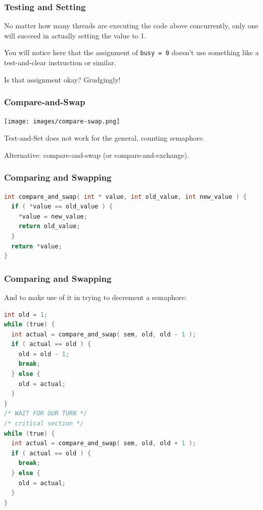 \begin{frame}
\frametitle{Testing and Setting}

No matter how many threads are executing the code above concurrently, only one will succeed in actually setting the value to 1.

You will notice here that the assignment of \texttt{busy = 0} doesn't use something like a test-and-clear instruction or similar.

Is that assignment okay? Grudgingly!

\end{frame}

\begin{frame}
\frametitle{Compare-and-Swap}

\begin{center}
	\texttt{[image: images/compare-swap.png]}
\end{center}

Test-and-Set does not work for the general, counting semaphore.

Alternative: \alert{compare-and-swap} (or compare-and-exchange).

\end{frame}

\begin{frame}[fragile]
\frametitle{Comparing and Swapping}

\begin{lstlisting}[language=C]
int compare_and_swap( int * value, int old_value, int new_value ) {
  if ( *value == old_value ) {
    *value = new_value;
    return old_value;
  }
  return *value;
}
\end{lstlisting}

\end{frame}

\begin{frame}[fragile]
\frametitle{Comparing and Swapping}

And to make use of it in trying to decrement a semaphore:

\begin{lstlisting}[language=C]
int old = 1;
while (true) {
  int actual = compare_and_swap( sem, old, old - 1 );
  if ( actual == old ) {
    old = old - 1;
    break;
  } else {
    old = actual;
  }
}
/* WAIT FOR OUR TURN */
/* critical section */
while (true) {
  int actual = compare_and_swap( sem, old, old + 1 );
  if ( actual == old ) {
    break;
  } else {
    old = actual;
  }
}
\end{lstlisting}

\end{frame}

